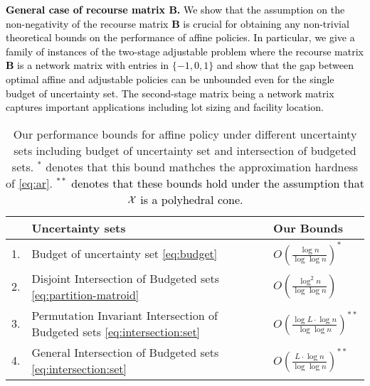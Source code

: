 \documentclass[moor]{informs1}              %
\newcommand{\mb}[1]{\ensuremath{\boldsymbol{#1}}}
\newcommand*{\red}{\textcolor{black}}
\begin{document}
\begin{enumerate}
\red{
\item [(d)] {\bf General case of recourse matrix $\mb B$.} 
We show that the  assumption on the non-negativity of the recourse matrix $\mb B$ is crucial for obtaining any non-trivial theoretical bounds on the performance of affine policies. In particular, we give a family of instances of the two-stage adjustable problem where the recourse matrix $\mb B$ is a network matrix with entries in $\{-1,0,1\}$ and show that the gap between optimal affine and adjustable policies can be unbounded even for the single budget of uncertainty set. The second-stage matrix being a network matrix captures important applications including lot sizing and facility location. }
\end{enumerate}




\begin{table}[ht]
\centering
\begin{tabular} {|l|l|l|}
  \hline
& Uncertainty sets   & Our Bounds \\
 \hline
1.& Budget of uncertainty set  \eqref{eq:budget} & \large{$O\left( \frac{\log n}{\log \log n} \right)^*$}    \\
   \hline
2.& Disjoint Intersection of Budgeted sets \eqref{eq:partition-matroid} &  \large{$O \left( \frac{\log^2 n}{\log \log n}   \right)$}    \\
\hline
3. & Permutation Invariant Intersection of Budgeted sets  \eqref{eq:intersection:set}& \large{$O \left(  \frac{\log L \cdot \log n}{\log \log n}  \right)^{**}$} \\
\hline
4. & General Intersection of Budgeted sets   \eqref{eq:intersection:set}& \large{$O \left(  \frac{L \cdot \log n}{\log \log n}   \right)^{**}  $}  \\
\hline
\end{tabular}%
\caption{Our performance bounds for affine policy under different uncertainty sets including budget of uncertainty set and intersection of budgeted sets. $^*$ denotes that this bound mathches the approximation hardness of \eqref{eq:ar}. \red{$^{**}$ denotes that these bounds hold under the assumption that $\cal X$ is a polyhedral cone.} }\label{tab:results}
 \end{table}
\end{document}
